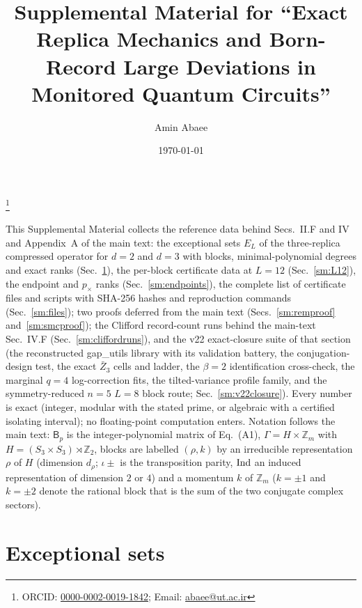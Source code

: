 \documentclass[aps,prx,reprint,superscriptaddress,nobibnotes,longbibliography]{revtex4-2}
\begin{document}
\title{Supplemental Material for ``Exact Replica Mechanics and Born-Record Large Deviations in Monitored Quantum Circuits''}
\author{Amin Abaee}
\thanks{ORCID: \href{https://orcid.org/0000-0002-0019-1842}{0000-0002-0019-1842}; Email: \href{mailto:abaee@ut.ac.ir}{abaee@ut.ac.ir}}
\date{\today}
\maketitle

This Supplemental Material collects the reference data behind Secs.~II.F and IV and Appendix~A of the main text: the exceptional sets $E_L$ of the three-replica compressed operator for $d=2$ and $d=3$ with blocks, minimal-polynomial degrees and exact ranks (Sec.~\ref{sm:E}), the per-block certificate data at $L=12$ (Sec.~\ref{sm:L12}), the endpoint and $p_\times$ ranks (Sec.~\ref{sm:endpoints}), the complete list of certificate files and scripts with SHA-256 hashes and reproduction commands (Sec.~\ref{sm:files}); two proofs deferred from the main text (Secs.~\ref{sm:remproof} and~\ref{sm:smcproof}); the Clifford record-count runs behind the main-text Sec.~IV.F (Sec.~\ref{sm:cliffordruns}), and the v22 exact-closure suite of that section (the reconstructed gap\_utils library with its validation battery, the conjugation-design test, the exact $\bar Z_3$ cells and ladder, the $\beta=2$ identification cross-check, the marginal $q=4$ log-correction fits, the tilted-variance profile family, and the symmetry-reduced $n=5$ $L=8$ block route; Sec.~\ref{sm:v22closure}).  Every number is exact (integer, modular with the stated prime, or algebraic with a certified isolating interval); no floating-point computation enters.  Notation follows the main text: $\mathsf B_p$ is the integer-polynomial matrix of Eq.~(A1), $\Gamma=H\times\mathbb Z_m$ with $H=(S_3\times S_3)\rtimes\mathbb Z_2$, blocks are labelled $(\rho,k)$ by an irreducible representation $\rho$ of $H$ (dimension $d_\rho$; $\iota\pm$ is the transposition parity, ${\rm Ind}$ an induced representation of dimension $2$ or $4$) and a momentum $k$ of $\mathbb Z_m$ ($k=\pm1$ and $k=\pm2$ denote the rational block that is the sum of the two conjugate complex sectors).

\section{Exceptional sets}
\label{sm:E}
\end{document}
